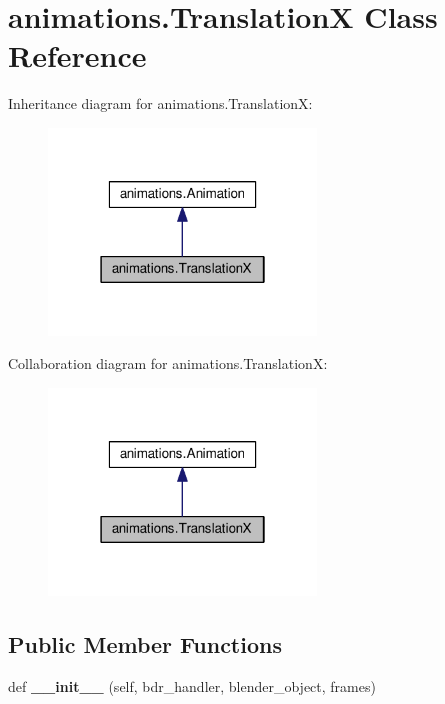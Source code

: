 \hypertarget{classanimations_1_1TranslationX}{}\section{animations.\+TranslationX Class Reference}
\label{classanimations_1_1TranslationX}


Inheritance diagram for animations.\+TranslationX\+:\nopagebreak
\begin{figure}[H]
\begin{center}
\leavevmode
\includegraphics[width=202pt]{classanimations_1_1TranslationX__inherit__graph}
\end{center}
\end{figure}


Collaboration diagram for animations.\+TranslationX\+:\nopagebreak
\begin{figure}[H]
\begin{center}
\leavevmode
\includegraphics[width=202pt]{classanimations_1_1TranslationX__coll__graph}
\end{center}
\end{figure}
\subsection*{Public Member Functions}
\begin{DoxyCompactItemize}
\item 
def {\bfseries \+\_\+\+\_\+init\+\_\+\+\_\+} (self, bdr\+\_\+handler, blender\+\_\+object, frames)\hypertarget{classanimations_1_1TranslationX_af68a0c8030c1d67f71ab91967900d3d2}{}\label{classanimations_1_1TranslationX_af68a0c8030c1d67f71ab91967900d3d2}

\end{DoxyCompactItemize}
